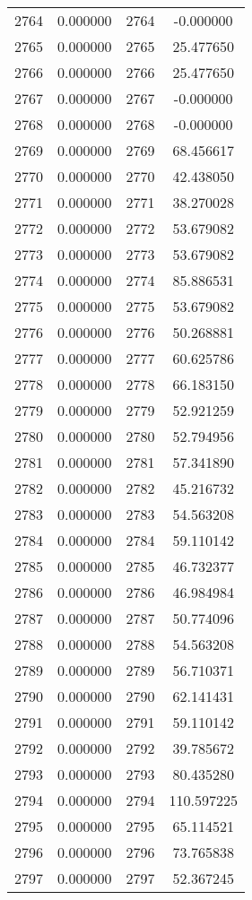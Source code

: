 \documentclass[12pt]{article}
\begin{document}
\begin{longtable}{@{}cccc@{}}
2764 & 0.000000 & 2764 & -0.000000 \\
2765 & 0.000000 & 2765 & 25.477650 \\
2766 & 0.000000 & 2766 & 25.477650 \\
2767 & 0.000000 & 2767 & -0.000000 \\
2768 & 0.000000 & 2768 & -0.000000 \\
2769 & 0.000000 & 2769 & 68.456617 \\
2770 & 0.000000 & 2770 & 42.438050 \\
2771 & 0.000000 & 2771 & 38.270028 \\
2772 & 0.000000 & 2772 & 53.679082 \\
2773 & 0.000000 & 2773 & 53.679082 \\
2774 & 0.000000 & 2774 & 85.886531 \\
2775 & 0.000000 & 2775 & 53.679082 \\
2776 & 0.000000 & 2776 & 50.268881 \\
2777 & 0.000000 & 2777 & 60.625786 \\
2778 & 0.000000 & 2778 & 66.183150 \\
2779 & 0.000000 & 2779 & 52.921259 \\
2780 & 0.000000 & 2780 & 52.794956 \\
2781 & 0.000000 & 2781 & 57.341890 \\
2782 & 0.000000 & 2782 & 45.216732 \\
2783 & 0.000000 & 2783 & 54.563208 \\
2784 & 0.000000 & 2784 & 59.110142 \\
2785 & 0.000000 & 2785 & 46.732377 \\
2786 & 0.000000 & 2786 & 46.984984 \\
2787 & 0.000000 & 2787 & 50.774096 \\
2788 & 0.000000 & 2788 & 54.563208 \\
2789 & 0.000000 & 2789 & 56.710371 \\
2790 & 0.000000 & 2790 & 62.141431 \\
2791 & 0.000000 & 2791 & 59.110142 \\
2792 & 0.000000 & 2792 & 39.785672 \\
2793 & 0.000000 & 2793 & 80.435280 \\
2794 & 0.000000 & 2794 & 110.597225 \\
2795 & 0.000000 & 2795 & 65.114521 \\
2796 & 0.000000 & 2796 & 73.765838 \\
2797 & 0.000000 & 2797 & 52.367245 \\

\end{longtable}
\end{document}
